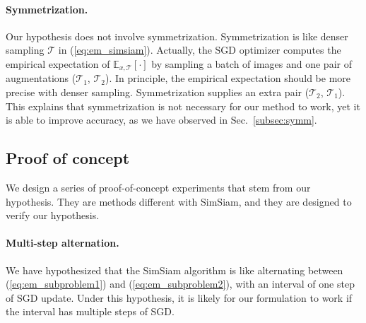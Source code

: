 \documentclass[final]{cvpr}
\begin{document}
\paragraph{Symmetrization.} Our hypothesis does not involve symmetrization. Symmetrization is like denser sampling $\mathcal{T}$ in (\ref{eq:em_simsiam}). Actually, the SGD optimizer computes the empirical expectation of $\mathbb{E}_{x, \mathcal{T}}[\cdot]$ by sampling a batch of images and one pair of augmentations ($\mathcal{T}_1$, $\mathcal{T}_2$). In principle, the empirical expectation should be more precise with denser sampling. Symmetrization supplies an extra pair ($\mathcal{T}_2$, $\mathcal{T}_1$).
This explains that symmetrization is not necessary for our method to work, yet it is able to improve accuracy, as we have observed in Sec.~\ref{subsec:symm}.

\subsection{Proof of concept} \label{subsec:poc}

We design a series of proof-of-concept experiments that stem from our hypothesis. They are methods different with SimSiam, and they are designed to verify our hypothesis.

\paragraph{Multi-step alternation.}
We have hypothesized that the 
SimSiam algorithm is like alternating between (\ref{eq:em_subproblem1}) and (\ref{eq:em_subproblem2}), with an interval of one step of SGD update. Under this hypothesis, it is likely for our formulation to work if the interval has multiple steps of SGD. 
\end{document}
